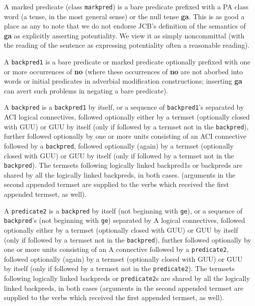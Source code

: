 \documentclass[12pt]{book}
\begin{document}
{A marked predicate (class {\tt markpred}) is a bare predicate prefixed with a PA class word (a tense, in the most general sense) or the null tense {\bf ga}.
This is as good a place as any to note that we do not endorse JCB's definition of the semantics of {\bf ga} as explicitly asserting potentiality.  We view it as simply noncommittal (with the reading of the sentence as expressing potentiality often a reasonable reading).

A {\tt backpred1} is a bare predicate or marked predicate optionally prefixed with one or more occurrences of {\bf no} (where these occurrences of {\bf no} are not aborbed into words or initial predicates in adverbial modification constructions;  inserting {\bf ga} can avert such problems in negating a bare predicate).

A {\tt backpred} is a {\tt backpred1} by itself, or a sequence of {\tt backpred1}'s separated by ACI logical connectives, followed optionally either
by a termset (optionally closed with GUU) or GUU by itself (only if followed by a termset not in the {\tt backpred}), further followed optionally by one or more units consisting of an ACI connective followed by a {\tt backpred}, followed optionally (again) by a termset (optionally closed with GUU) or GUU by itself (only if followed by a termset not in the {\tt backpred}).  The termsets following logically linked backpred1s or backpreds are shared by all the logically linked backpreds, in both cases.   (arguments in the second appended termset are supplied to the verbs which received the first appended termset, as well).

A {\tt predicate2} is a {\tt backpred} by itself (not beginning with {\tt ge}), or a sequence of {\tt backpred}'s (not beginning with {\tt ge}) separated by A logical connectives, followed optionally either
by a termset (optionally closed with GUU) or GUU by itself (only if followed by a termset not in the {\tt backpred}), further followed optionally by one or more units consisting of an A connective followed by a {\tt predicate2}, followed optionally (again) by a termset (optionally closed with GUU) or GUU by itself (only if followed by a termset not in the {\tt predicate2}).  The termsets following logically linked backpreds or {\tt predicate2}s are shared by all the logically linked backpreds, in both cases (arguments in the second appended termset are supplied to the verbs which received the first appended termset, as well).

}
\end{document}
